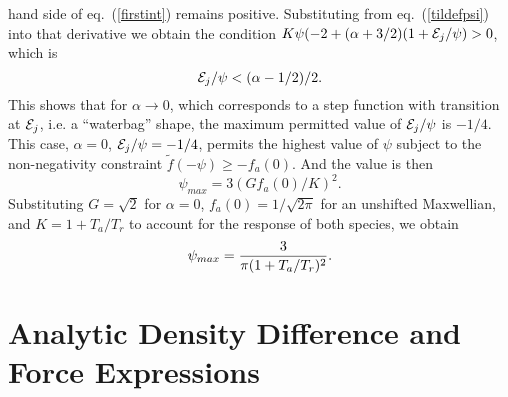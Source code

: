 \documentclass[aip,pop,article-title]{revtex4-2}
\def\energy{{\cal E}}
\begin{document}
hand side of eq.\ (\ref{firstint}) remains positive. Substituting from 
eq.\ (\ref{tildefpsi}) into that derivative we obtain the condition
$K\psi(-2+(\alpha+3/2)(1+\energy_j/\psi)>0 $,
which is 
\begin{equation}
  \energy_j/\psi < (\alpha-1/2)/2.
\end{equation}
This shows that for $\alpha\to 0$, which corresponds to a step
function with transition at $\energy_j$, i.e. a ``waterbag'' shape, the
maximum permitted value of $\energy_j/\psi$ is $-1/4$. This case,
$\alpha=0$, $\energy_j/\psi=-1/4$, permits the highest value of $\psi$
subject to the non-negativity constraint
$\tilde f(-\psi) \ge -f_a(0)$. And the value is then
\begin{equation}
  \psi_{max}= 3(Gf_a(0)/K)^2.
\end{equation}
Substituting $G=\sqrt{2}$ for $\alpha=0$, $f_a(0)=1/\sqrt{2\pi}$ for an
unshifted Maxwellian, and $K=1+T_a/T_r$ to account for the response of
both species, we obtain 
\begin{equation}
  \psi_{max}={3\over\pi(1+T_a/T_r)^2}.
\end{equation}




\section{Analytic Density Difference and Force Expressions}\label{appb}
\end{document}
